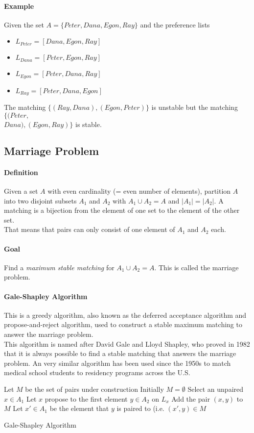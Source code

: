 \documentclass[10pt,a4paper]{book}
\newcommand{\ind}{\hspace*{\parindent}}
\begin{document}
\paragraph*{Example}
Given the set $A = \{Peter, Dana, Egon, Ray\}$ and the preference lists
\begin{itemize}
\item $L_{Peter} = [Dana, Egon, Ray]$
\item $L_{Dana} = [Peter, Egon, Ray]$
\item $L_{Egon} = [Peter, Dana, Ray]$
\item $L_{Ray} = [Peter, Dana, Egon]$
\end{itemize}
The matching $\{(Ray, Dana), (Egon, Peter)\}$ is unstable but the matching $\{(Peter,$\\$ Dana), (Egon, Ray)\}$ is stable.

\subsection{Marriage Problem}
\paragraph*{Definition}
Given a set $A$ with even cardinality (= even number of elements), partition $A$ into two disjoint subsets $A_1$ and $A_2$ with $A_1 \cup A_2 = A$ and $|A_1| = |A_2|$. A matching is a bijection from the element of one set to the element of the other set.\\
That means that pairs can only consist of one element of $A_1$ and $A_2$ each.
\paragraph*{Goal}
Find a \textit{maximum stable matching} for $A_1 \cup A_2 = A$. This is called the marriage problem.
\paragraph*{Gale-Shapley Algorithm}
This is a greedy algorithm, also known as the deferred acceptance algorithm and propose-and-reject algorithm, used to construct a stable maximum matching to answer the marriage problem. \\
\ind This algorithm is named after David Gale and Lloyd Shapley, who proved in 1982 that it is always possible to find a stable matching that answers the marriage problem. An very similar algorithm has been used since the 1950s to match medical school students to residency programs across the U.S.
\begin{algorithm}
\DontPrintSemicolon
Let $M$ be the set of pairs under construction\;
Initially $M = \emptyset$\;
{Select an unpaired $x \in A_1$\;
Let $x$ propose to the first element $y \in A_2$ on $L_x$\;
{Add the pair $(x,y)$ to $M$}
{Let $x' \in A_1$ be the element that $y$ is paired to (i.e. $(x',y) \in M$\;
}}
\caption{Gale-Shapley Algorithm}
\end{algorithm}
\end{document}
